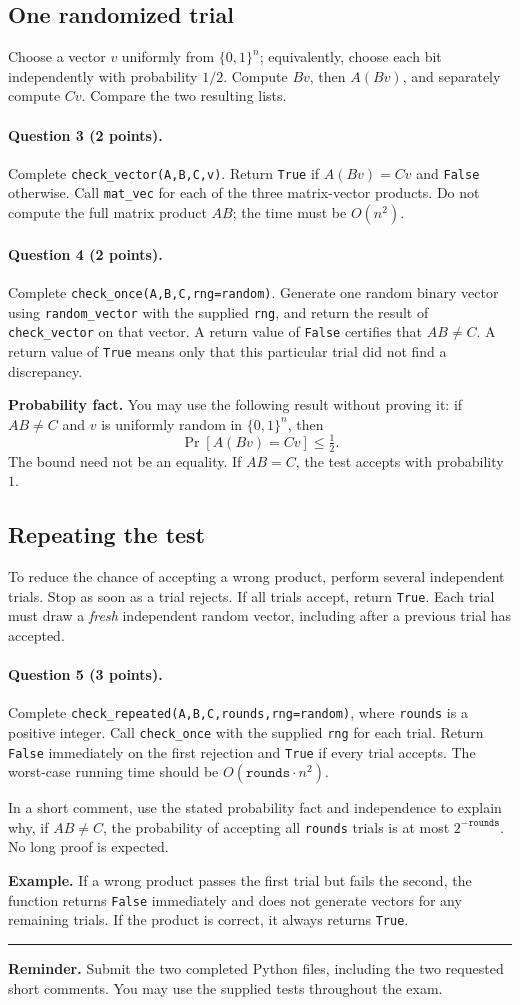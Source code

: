 \documentclass[11pt,a4paper]{article}
\newcommand{\q}[2]{\paragraph{Question #1 (#2 points).}}
\begin{document}
\subsection*{One randomized trial}
Choose a vector $v$ uniformly from $\{0,1\}^n$; equivalently, choose each bit independently with probability $1/2$. Compute $Bv$, then $A(Bv)$, and separately compute $Cv$. Compare the two resulting lists.
\q{3}{2} Complete \texttt{check\_vector(A,B,C,v)}. Return \texttt{True} if $A(Bv)=Cv$ and \texttt{False} otherwise. Call \texttt{mat\_vec} for each of the three matrix-vector products. Do not compute the full matrix product $AB$; the time must be $O(n^2)$.
\q{4}{2} Complete \texttt{check\_once(A,B,C,rng=random)}. Generate one random binary vector using \texttt{random\_vector} with the supplied \texttt{rng}, and return the result of \texttt{check\_vector} on that vector. A return value of \texttt{False} certifies that $AB\ne C$. A return value of \texttt{True} means only that this particular trial did not find a discrepancy.

\textbf{Probability fact.} You may use the following result without proving it: if $AB\ne C$ and $v$ is uniformly random in $\{0,1\}^n$, then
\[
\Pr[A(Bv)=Cv]\le \tfrac12.
\]
The bound need not be an equality. If $AB=C$, the test accepts with probability $1$.
\newpage
\subsection*{Repeating the test}
To reduce the chance of accepting a wrong product, perform several independent trials. Stop as soon as a trial rejects. If all trials accept, return \texttt{True}. Each trial must draw a \emph{fresh} independent random vector, including after a previous trial has accepted.
\q{5}{3} Complete \texttt{check\_repeated(A,B,C,rounds,rng=random)}, where \texttt{rounds} is a positive integer. Call \texttt{check\_once} with the supplied \texttt{rng} for each trial. Return \texttt{False} immediately on the first rejection and \texttt{True} if every trial accepts. The worst-case running time should be $O(\texttt{rounds}\cdot n^2)$.

In a short comment, use the stated probability fact and independence to explain why, if $AB\ne C$, the probability of accepting all \texttt{rounds} trials is at most $2^{-\texttt{rounds}}$. No long proof is expected.

\textbf{Example.} If a wrong product passes the first trial but fails the second, the function returns \texttt{False} immediately and does not generate vectors for any remaining trials. If the product is correct, it always returns \texttt{True}.

\vspace{1cm}\hrule\vspace{5pt}\textbf{Reminder.} Submit the two completed Python files, including the two requested short comments. You may use the supplied tests throughout the exam.
\end{document}

